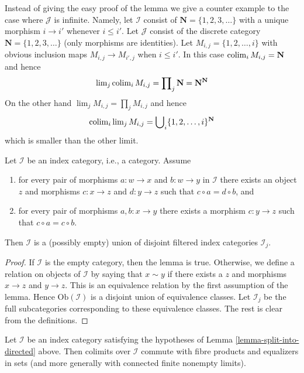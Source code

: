 \noindent
Instead of giving the easy proof of the lemma we give a counter example to
the case where $\mathcal{J}$ is infinite. Namely, let
$\mathcal{I}$ consist of $\mathbf{N} = \{1, 2, 3, \ldots\}$
with a unique morphism $i \to i'$ whenever $i \leq i'$.
Let $\mathcal{J}$ consist of the discrete category
$\mathbf{N} = \{1, 2, 3, \ldots\}$ (only morphisms are identities).
Let $M_{i, j} = \{1, 2, \ldots, i\}$ with obvious inclusion maps
$M_{i, j} \to M_{i', j}$ when $i \leq i'$. In this case
$\mathop{\rm colim}\nolimits_i M_{i, j} = \mathbf{N}$ and hence
$$
\mathop{\rm lim}\nolimits_j \mathop{\rm colim}\nolimits_i M_{i, j}
=
\prod\nolimits_j \mathbf{N}
=
\mathbf{N}^\mathbf{N}
$$
On the other hand $\lim_j M_{i, j} = \prod\nolimits_j M_{i, j}$ and
hence
$$
\mathop{\rm colim}\nolimits_i \mathop{\rm lim}\nolimits_j M_{i, j}
=
\bigcup\nolimits_i \{1, 2, \ldots, i\}^{\mathbf{N}}
$$
which is smaller than the other limit.

\begin{lemma}
\label{lemma-split-into-directed}
Let $\mathcal{I}$ be an index category, i.e., a category.
Assume
\begin{enumerate}
\item for every pair of morphisms $a : w \to x$ and $b : w \to y$
in $\mathcal{I}$ there exists an object $z$ and morphisms $c : x \to z$
and $d : y \to z$ such that $c \circ a = d \circ b$, and
\item for every pair of morphisms $a, b : x \to y$ there exists
a morphism $c : y \to z$ such that $c \circ a = c \circ b$.
\end{enumerate}
Then $\mathcal{I}$ is a (possibly empty) union
of disjoint filtered index categories $\mathcal{I}_j$.
\end{lemma}

\begin{proof}
If $\mathcal{I}$ is the empty category, then the lemma is true.
Otherwise, we define a relation on objects of $\mathcal{I}$ by
saying that $x \sim y$ if there exists a $z$ and
morphisms $x \to z$ and $y \to z$. This is an equivalence
relation by the first assumption of the lemma. Hence $\text{Ob}(\mathcal{I})$
is a disjoint union of equivalence classes. Let $\mathcal{I}_j$
be the full subcategories corresponding to these equivalence classes.
The rest is clear from the definitions.
\end{proof}

\begin{lemma}
\label{lemma-almost-directed-commutes-equalizers}
Let $\mathcal{I}$ be an index category satisfying the hypotheses of
Lemma \ref{lemma-split-into-directed} above. Then colimits over $\mathcal{I}$
commute with fibre products and equalizers in sets (and more generally
with connected finite nonempty limits).
\end{lemma}

